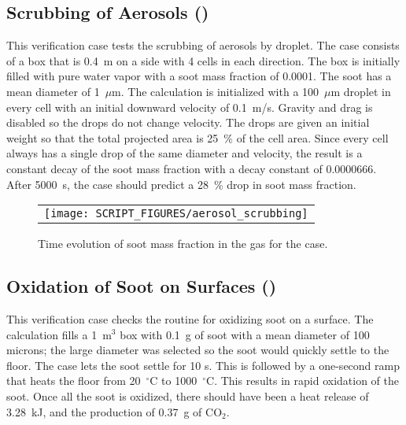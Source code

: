 \documentclass[11pt]{book}
\begin{document}
\subsection{Scrubbing of Aerosols (\texorpdfstring{}{aerosol\_scrubbing})}
\label{aerosol_scrubbing}

This verification case tests the scrubbing of aerosols by droplet. The case consists of a box that is 0.4~m on a side with 4 cells in each direction. The box is initially filled with pure water vapor with a soot mass fraction of 0.0001. The soot has a mean diameter of 1~$\mu$m. The calculation is initialized with a 100~$\mu$m droplet in every cell with an initial downward velocity of 0.1~m/s. Gravity and drag is disabled so the drops do not change velocity. The drops are given an initial weight so that the total projected area is 25~\% of the cell area. Since every cell always has a single drop of the same diameter and velocity, the result is a constant decay of the soot mass fraction with a decay constant of 0.0000666. After 5000~s, the case should predict a 28~\% drop in soot mass fraction.

\begin{figure}[ht]
    \centering
    \begin{tabular}{c}
        \texttt{[image: SCRIPT\_FIGURES/aerosol\_scrubbing]}
    \end{tabular}
    \caption[Gas phase soot mass fractions the  cases]{Time evolution of soot mass fraction in the gas for the  case.}
    \label{fig:scrubbing}
\end{figure}


\subsection{Oxidation of Soot on Surfaces (\texorpdfstring{}{soot\_oxidation\_wall})}
\label{soot_oxidation_wall}

This verification case checks the routine for oxidizing soot on a surface. The calculation fills a 1~m$^3$ box with 0.1~g of soot with a mean diameter of 100 microns; the large diameter was selected so the soot would quickly settle to the floor. The case lets the soot settle for 10 s. This is followed by a one-second ramp that heats the floor from 20~$^\circ$C to 1000~$^\circ$C. This results in rapid oxidation of the soot. Once all the soot is oxidized, there should have been a heat release of  3.28~kJ, and the production of 0.37~g of CO$_2$.
\end{document}
